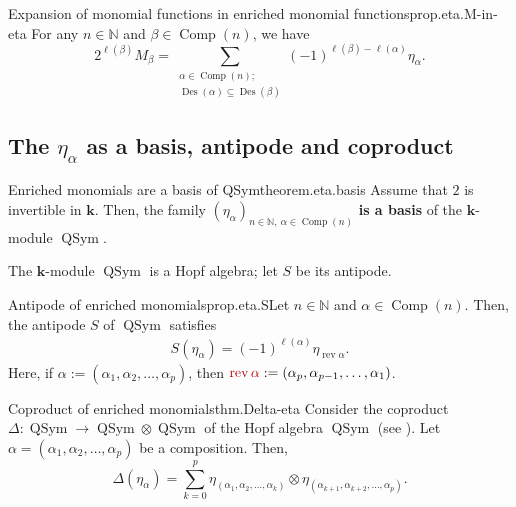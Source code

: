 \documentclass[numbers=enddot,12pt,final,onecolumn,notitlepage]{scrartcl}%
\newcommand{\al}{\alpha}
\newcommand{\NN}{\mathbb{N}} %
\newcommand{\kk}{\mathbf{k}} %
\newcommand{\QSym}{\operatorname{QSym}}
\newcommand{\Des}{\operatorname{Des}}
\newcommand{\Comp}{\operatorname{Comp}}
\newcommand{\tup}[1]{\left( #1 \right)}
\newcommand{\defnm}[1]{{\color{darkred} #1}}
\newcommand{\0}{\phantom{c}}
\let\sumnonlimits\sum
\renewcommand{\sum}{\sumnonlimits\limits}
\begin{document}
\begin{proposition}{Expansion of monomial functions in enriched monomial functions}{prop.eta.M-in-eta}
For any $n\in\NN$ and $\beta\in \Comp(n)$, we have
\[
2^{\ell\left(  \beta\right)  }M_{\beta}=\sum_{\substack{\alpha\in
\Comp(n);\\\Des\left(  \alpha\right)  \subseteq \Des\left(
\beta\right)  }}\left(  -1\right)  ^{\ell\left(  \beta\right)  -\ell\left(
\alpha\right)  }\eta_{\alpha}.
\]
\end{proposition}

\subsection{The $\eta_{\alpha}$ as a basis, antipode and coproduct}
\begin{theorem}{Enriched monomials are a basis of QSym}{theorem.eta.basis}
Assume that $2$ is invertible in $\kk$. Then, the
family $\left(  \eta_{\alpha}\right)  _{n \in \NN,\ \alpha\in\Comp(n)}$ \textbf{is a basis} of the $\kk$-module $\QSym$.
\end{theorem}

The $\kk$-module $\QSym$ is a Hopf algebra; let $S$ be its antipode.

\begin{proposition}{Antipode of enriched monomials}{prop.eta.S}Let $n \in \NN$ and $\alpha\in\Comp(n)$. Then, the antipode $S$
of $\QSym$ satisfies
\begin{align}
S\left(  \eta_{\alpha}\right)  =\left(  -1\right)  ^{\ell\left(
\alpha\right)  }\eta_{\operatorname*{rev}\alpha}.
\label{eq.eta.antipode}
\end{align}
Here, if $\alpha := \tup{\alpha_1, \alpha_2, \ldots, \alpha_p}$, then
$\defnm{\operatorname{rev}\alpha} := \tup{\alpha_p, \alpha_{p-1}, \ldots, \alpha_1}$.
\end{proposition}

\begin{theorem}{Coproduct of enriched monomials}{thm.Delta-eta} Consider the coproduct $\Delta:\operatorname*{QSym}\rightarrow
\operatorname*{QSym}\otimes\operatorname*{QSym}$ of the Hopf algebra
$\operatorname*{QSym}$ (see \cite[\S 5.1]{GriRei20}). Let $\alpha = \left(\al_1, \al_2, \ldots, \al_p\right)$
be a composition. Then,
\[
\Delta\left(  \eta_{\alpha}\right)  =\sum_{k=0}^p
\eta_{\left(\al_1, \al_2, \ldots, \al_k\right)} \otimes
\eta_{\left(\al_{k+1}, \al_{k+2}, \ldots, \al_p\right)} .
\]

\end{theorem}
\end{document}
